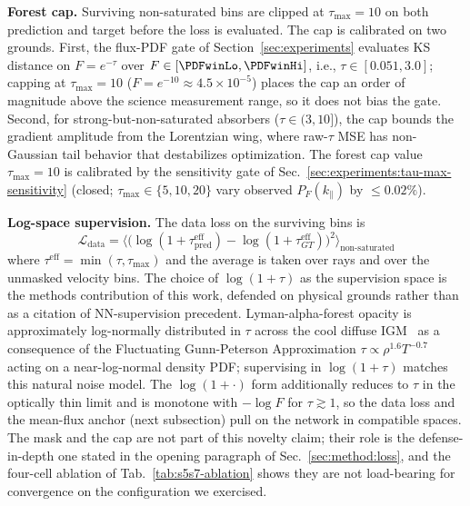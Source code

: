 \textbf{Forest cap.} Surviving non-saturated bins are clipped at $\tau_{\max} = 10$ on both prediction and target before the loss is evaluated. The cap is calibrated on two grounds. First, the flux-PDF gate of Section~\ref{sec:experiments} evaluates KS distance on $F = e^{-\tau}$ over $F \in [\PDFwinLo, \PDFwinHi]$, i.e., $\tau \in [0.051, 3.0]$; capping at $\tau_{\max} = 10$ ($F = e^{-10} \approx 4.5 \times 10^{-5}$) places the cap an order of magnitude above the science measurement range, so it does not bias the gate. Second, for strong-but-non-saturated absorbers ($\tau \in (3, 10]$), the cap bounds the gradient amplitude from the Lorentzian wing, where raw-$\tau$ MSE has non-Gaussian tail behavior that destabilizes optimization. The forest cap value $\tau_{\max} = 10$ is calibrated by the sensitivity gate of Sec.~\ref{sec:experiments:tau-max-sensitivity} (closed; $\tau_{\max} \in \{5, 10, 20\}$ vary observed $P_F(k_\parallel)$ by $\leq 0.02\%$).

\textbf{Log-space supervision.}
\label{sec:method:loss:logspace}
The data loss on the surviving bins is
\begin{equation}
\mathcal{L}_{\text{data}} = \big\langle \big( \log(1 + \tau_{\text{pred}}^{\text{eff}}) - \log(1 + \tau_{GT}^{\text{eff}}) \big)^2 \big\rangle_{\text{non-saturated}}
\label{eq:data-loss}
\end{equation}
where $\tau^{\text{eff}} = \min(\tau, \tau_{\max})$ and the average is taken over rays and over the unmasked velocity bins. The choice of $\log(1+\tau)$ as the supervision space is the methods contribution of this work, defended on physical grounds rather than as a citation of NN-supervision precedent. Lyman-alpha-forest opacity is approximately log-normally distributed in $\tau$ across the cool diffuse IGM~\cite{bi_davidsen1997, hui_gnedin1997} as a consequence of the Fluctuating Gunn-Peterson Approximation $\tau \propto \rho^{1.6} T^{-0.7}$ acting on a near-log-normal density PDF; supervising in $\log(1+\tau)$ matches this natural noise model. The $\log(1+\cdot)$ form additionally reduces to $\tau$ in the optically thin limit and is monotone with $-\log F$ for $\tau \gtrsim 1$, so the data loss and the mean-flux anchor (next subsection) pull on the network in compatible spaces. The mask and the cap are not part of this novelty claim; their role is the defense-in-depth one stated in the opening paragraph of Sec.~\ref{sec:method:loss}, and the four-cell ablation of Tab.~\ref{tab:s5s7-ablation} shows they are not load-bearing for convergence on the configuration we exercised.

